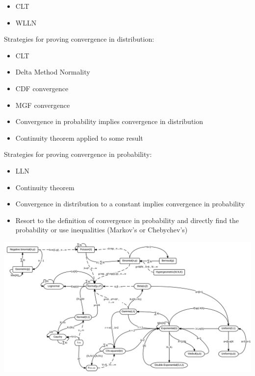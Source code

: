 \documentclass[
]{article}
\providecommand{\tightlist}{%
  \setlength{\itemsep}{0pt}\setlength{\parskip}{0pt}}
\begin{document}
\begin{itemize}
\tightlist
\item
  CLT
\item
  WLLN
\end{itemize}

Strategies for proving convergence in distribution:

\begin{itemize}
\tightlist
\item
  CLT
\item
  Delta Method Normality
\item
  CDF convergence
\item
  MGF convergence
\item
  Convergence in probability implies convergence in distribution
\item
  Continuity theorem applied to some result
\end{itemize}

Strategies for proving convergence in probability:

\begin{itemize}
\tightlist
\item
  LLN
\item
  Continuity theorem
\item
  Convergence in distribution to a constant implies convergence in
  probability
\item
  Resort to the definition of convergence in probability and directly
  find the probability or use inequalities (Markov's or Chebychev's)
\end{itemize}

\begin{center}\includegraphics[width=800px]{distr_relationship_wikipedia} \end{center}
\end{document}

